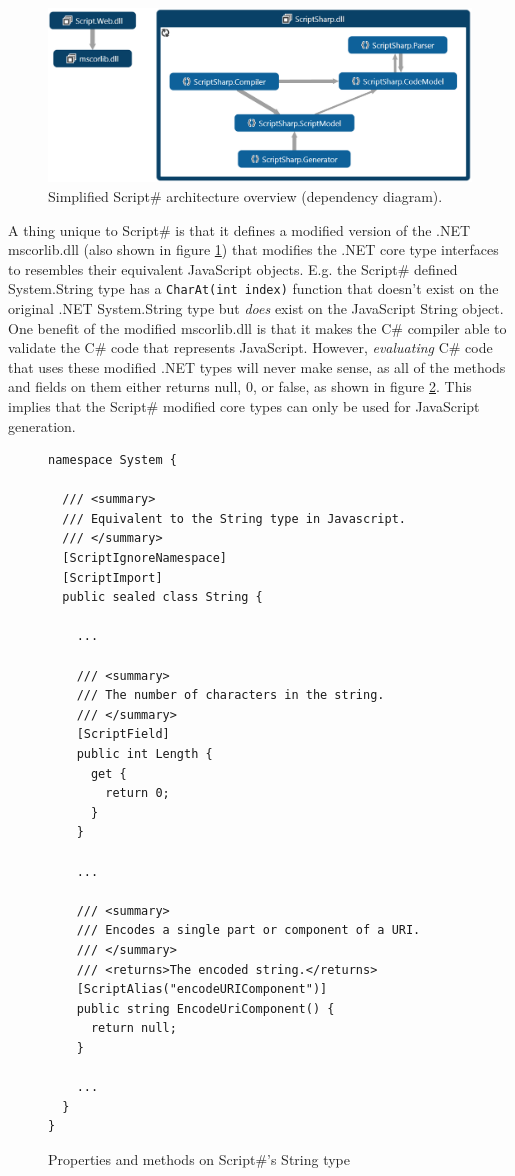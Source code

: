 		\begin{figure}[H]
			\begin{center}
				\centerline{\includegraphics[width=16cm]{resources/images/SimplifiedOverview.png}}
			\end{center}
			\caption{Simplified Script\# architecture overview (dependency diagram).}
			\label{simplifiedOverview}
		\end{figure}


		A thing unique to Script\# is that it defines a modified version of the .NET mscorlib.dll (also shown in figure \ref{simplifiedOverview}) that modifies the .NET core type interfaces to resembles their equivalent JavaScript objects. E.g. the Script\# defined System.String type has a \texttt{CharAt(int index)} function that doesn't exist on the original .NET System.String type but \emph{does} exist on the JavaScript String object. One benefit of the modified mscorlib.dll is that it makes the C\# compiler able to validate the C\# code that represents JavaScript. However, \emph{evaluating} C\# code that uses these modified .NET types will never make sense, as all of the methods and fields on them either returns null, 0, or false, as shown in figure \ref{fig:scriptsharp_net_types}. This implies that the Script\# modified core types can only be used for JavaScript generation.

		\begin{figure}
		\label{fig:scriptsharp_net_types}
			\begin{lstlisting}[language=CSharp,classoffset=1,morekeywords={String}]
namespace System {

  /// <summary>
  /// Equivalent to the String type in Javascript.
  /// </summary>
  [ScriptIgnoreNamespace]
  [ScriptImport]
  public sealed class String {

    ...

    /// <summary>
    /// The number of characters in the string.
    /// </summary>
    [ScriptField]
    public int Length {
      get {
        return 0;
      }
    }

    ...

    /// <summary>
    /// Encodes a single part or component of a URI.
    /// </summary>
    /// <returns>The encoded string.</returns>
    [ScriptAlias("encodeURIComponent")]
    public string EncodeUriComponent() {
      return null;
    }

    ...
  }
}

			\end{lstlisting}
			\caption{Properties and methods on Script\#'s String type}
		\end{figure}


